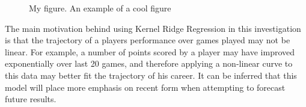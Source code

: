 \documentclass[a4paper,11pt,twoside]{article}
\begin{document}
      \begin{figure}[!htb]
        \caption{\label{fig:my-label} My figure.  An example of a cool figure}
      \end{figure}

The main motivation behind using Kernel Ridge Regression in this investigation is that the trajectory of a players performance over games played may not be linear. For example, a number of points scored by a player may have improved exponentially over last 20 games, and therefore applying a non-linear curve to this data may better fit the trajectory of his career. It can be inferred that this model will place more emphasis on recent form when attempting to forecast future results.
\end{document}
